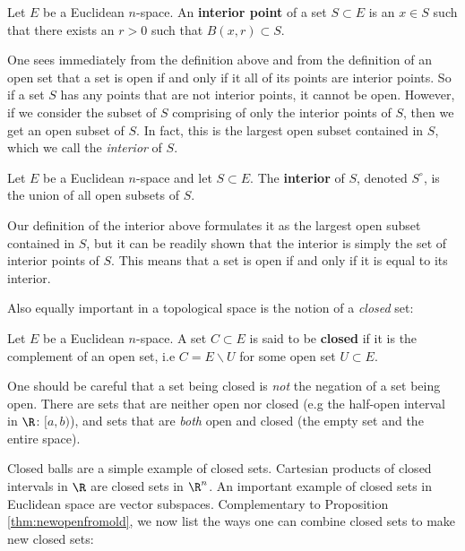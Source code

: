 \begin{definition}
  Let \( E \) be a Euclidean \( n \)-space. An \textbf{interior point} of a set \( S\subset E \) is an \( x\in S \) such that there exists an \( r>0 \) such that \( B(x,r)\subset S \).
\end{definition}

One sees immediately from the definition above and from the definition of an open set that a set is open if and only if it all of its points are interior points. So if a set \( S \) has any points that are not interior points, it cannot be open. However, if we consider the subset of \( S \) comprising of only the interior points of \( S \), then we get an open subset of \( S \). In fact, this is the largest open subset contained in \( S \), which we call the \emph{interior} of \( S \).

\begin{definition}
  Let \( E \) be a Euclidean \( n \)-space and let \( S\subset E \). The \textbf{interior} of \( S \), denoted \( S^\circ \), is the union of all open subsets of \( S \).
\end{definition}

Our definition of the interior above formulates it as the largest open subset contained in \( S \), but it can be readily shown that the interior is simply the set of interior points of \( S \). This means that a set is open if and only if it is equal to its interior.

\vspace{3mm}

Also equally important in a topological space is the notion of a \emph{closed} set:

\begin{definition}
  Let \( E \) be a Euclidean \( n \)-space. A set \( C\subset E \) is said to be \textbf{closed} if it is the complement of an open set, i.e \( C=E\backslash U \) for some open set \( U\subset E \).
\end{definition}

One should be careful that a set being closed is \emph{not} the negation of a set being open. There are sets that are neither open nor closed (e.g the half-open interval in \( \R \): \( [a,b) \)), and sets that are \emph{both} open and closed (the empty set and the entire space).

\vspace{3mm}

Closed balls are a simple example of closed sets. Cartesian products of closed intervals in \( \R \) are closed sets in \( \R^n \). An important example of closed sets in Euclidean space are vector subspaces. Complementary to Proposition \ref{thm:newopenfromold}, we now list the ways one can combine closed sets to make new closed sets:

